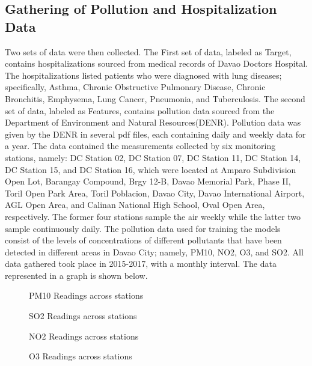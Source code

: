 ﻿\documentclass[10pt,11pt,12pt,oneside]{book}
\begin{document}
    \subsection{Gathering of Pollution and Hospitalization Data}
    Two sets of data were then collected. The First set of data, labeled as Target, contains hospitalizations sourced from medical records of Davao Doctors Hospital. The hospitalizations listed patients who were diagnosed with lung diseases; specifically, Asthma, Chronic Obstructive Pulmonary Disease, Chronic Bronchitis, Emphysema, Lung Cancer, Pneumonia, and Tuberculosis. The second set of data, labeled as Features, contains pollution data sourced from the Department of Environment and Natural
    Resources(DENR). Pollution data was given by the DENR in several pdf files, each containing daily and weekly data for a year. The data contained the measurements collected by six monitoring stations, namely: DC Station 02, DC Station 07, DC Station 11, DC Station 14, DC Station 15, and DC Station 16, which were located at Amparo Subdivision Open Lot, Barangay Compound, Brgy 12-B, Davao Memorial Park, Phase II, Toril Open Park Area, Toril Poblacion, Davao City, Davao International Airport, AGL Open
Area, and Calinan National High School, Oval Open Area, respectively. The former four stations sample the air weekly while the latter two sample continuously daily. The pollution data used for training the models consist of the levels of concentrations of different pollutants that have been detected in different areas in Davao City; namely, PM10, NO2, O3, and SO2. All data gathered took place in 2015-2017, with a monthly interval. The data represented in a graph is shown below.\\
\begin{figure}[H]
\centering
\resizebox{!}{10cm}{}
\caption{PM10 Readings across stations}
\label{fig:pm10graph}
\end{figure}
\begin{figure}[H]
\centering
\resizebox{!}{10cm}{}
\caption{SO2 Readings across stations}
\label{fig:so2graph}
\end{figure}
\begin{figure}[H]
\centering
\resizebox{!}{10cm}{}
\caption{NO2 Readings across stations}
\label{fig:no2graph}
\end{figure}
\begin{figure}[H]
\centering
\resizebox{!}{10cm}{}
\caption{O3 Readings across stations}
\label{fig:o3graph}
\end{figure}
\pagebreak
\end{document}
